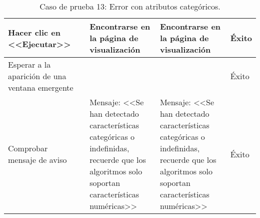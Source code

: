 \begin{table}[H]
\begin{tabular}{p{}p{}p{}p{}p{}}
Hacer clic en <<Ejecutar>>                            &                        & Encontrarse en la página de visualización                            & Encontrarse en la página de visualización                    & Éxito                            \\ \hline
Esperar a la aparición de una ventana emergente       &                   & & & Éxito  \\ \hline 
Comprobar mensaje de aviso                            &                        & Mensaje: <<Se han detectado características categóricas o indefinidas, recuerde que los algoritmos solo soportan características numéricas>> & Mensaje: <<Se han detectado características categóricas o indefinidas, recuerde que los algoritmos solo soportan características numéricas>> & Éxito \\ \hline
\end{tabular}
\caption{Caso de prueba 13: Error con atributos categóricos.}
\end{table}


